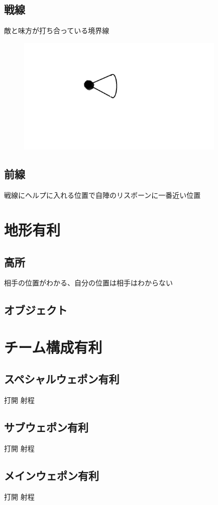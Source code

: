 \documentclass[a4paper,11pt]{jsbook}
\begin{document}
\subsection{戦線}
敵と味方が打ち合っている境界線
\begin{figure}[h]
  \begin{center}
    \includegraphics[width=10cm]{resoource/player.png}
  \end{center}
\end{figure}

\subsection{前線}
戦線にヘルプに入れる位置で自陣のリスボーンに一番近い位置

\section{地形有利}
\subsection{高所}
相手の位置がわかる、自分の位置は相手はわからない

\subsection{オブジェクト}
\section{チーム構成有利}
\subsection{スペシャルウェポン有利}
打開
射程
\subsection{サブウェポン有利}
打開
射程
\subsection{メインウェポン有利}
打開
射程
\end{document}
